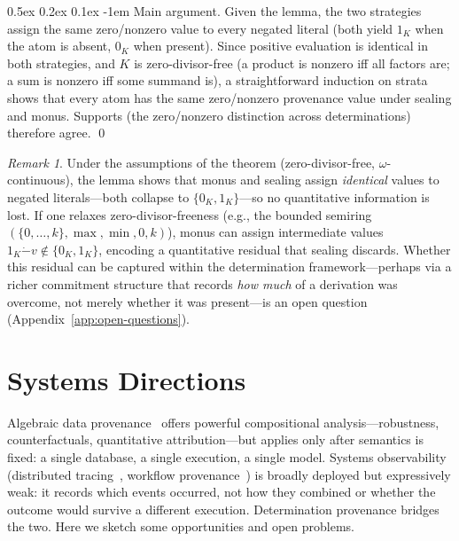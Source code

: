 \documentclass[acmsmall,review,anonymous]{acmart}
\makeatletter
\renewcommand{\paragraph}{\@startsection{paragraph}{4}{\z@}%
  {0.5ex \@plus 0.2ex \@minus 0.1ex}%
  {-1em}%
  {\normalfont\normalsize\bfseries}}
\theoremstyle{remark}
\newtheorem{remark}{Remark}
\numberwithin{definition}{section}
\numberwithin{theorem}{section}
\numberwithin{lemma}{section}
\numberwithin{corollary}{section}
\numberwithin{remark}{section}
\numberwithin{example}{section}
\numberwithin{observation}{section}
\numberwithin{assumption}{section}
\makeatother
\begin{document}
\paragraph{Main argument.}
Given the lemma, the two strategies assign the same zero/nonzero value
to every negated literal (both yield $1_K$ when the atom is absent,
$0_K$ when present).
Since positive evaluation is identical in both strategies, and $K$ is
zero-divisor-free (a product is nonzero iff all factors are; a sum is
nonzero iff some summand is), a straightforward induction on strata
shows that every atom has the same zero/nonzero provenance value under
sealing and monus.
Supports (the zero/nonzero distinction across determinations) therefore
agree.
\qed

\begin{remark}
  Under the assumptions of the theorem (zero-divisor-free,
  $\omega$-continuous), the lemma shows that monus and sealing assign
  \emph{identical} values to negated literals---both collapse to
  $\{0_K, 1_K\}$---so no quantitative information is lost.
  If one relaxes zero-divisor-freeness (e.g., the bounded semiring
  $(\{0,\ldots,k\}, \max, \min, 0, k)$), monus can assign intermediate
  values $1_K \mathbin{\dot{-}} v \notin \{0_K, 1_K\}$, encoding a
  quantitative residual that sealing discards.
  Whether this residual can be captured within the determination
  framework---perhaps via a richer commitment structure that records
  \emph{how much} of a derivation was overcome, not merely whether it
  was present---is an open question
  (Appendix~\ref{app:open-questions}).
\end{remark}


\section{Systems Directions}
\label{app:systems-lineage}
\label{app:certificates}

Algebraic data provenance~\cite{green2007provenance} offers powerful
compositional analysis---robustness, counterfactuals, quantitative
attribution---but applies only after semantics is fixed: a single
database, a single execution, a single model.
Systems observability (distributed
tracing~\cite{sigelman2010dapper}, workflow
provenance~\cite{seltzer2005provenance}) is broadly deployed but
expressively weak: it records which events occurred, not how they
combined or whether the outcome would survive a different execution.
Determination provenance bridges the two. Here we sketch some
opportunities and open problems.
\end{document}
